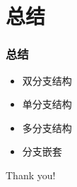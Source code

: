 \section{总结}

\begin{frame}[fragile]
    \frametitle{总结}

    \begin{itemize}
        \item 双分支结构
        \item 单分支结构
        \item 多分支结构
        \item 分支嵌套
    \end{itemize}
\end{frame}

\begin{frame}
    \begin{center}
        {\Huge Thank you!}
    \end{center}
\end{frame}


